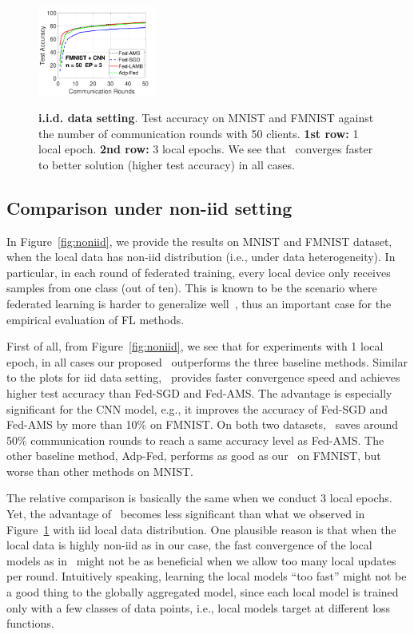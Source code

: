 \documentclass[manuscript,screen,review]{acmart}
\begin{document}
\begin{figure}[h]
\begin{center}
{        \hspace{-0.1in}\includegraphics[width=0.35\textwidth]{new_fmnist_mnist_fig/fmnist_testerror_cnn_ep3_iid1_reddi.pdf}
        }
    \end{center}
	\caption{\textbf{i.i.d. data setting}. Test accuracy on MNIST and FMNIST against the number of communication rounds with 50 clients. \textbf{1st row:} 1 local epoch. \textbf{2nd row:} 3 local epochs. We see that \algo\ converges faster to better solution (higher test accuracy) in all cases.
	}
	\label{fig:iid}\vspace{-0.1in}
\end{figure}


\subsection{Comparison under non-iid setting}



In Figure~\ref{fig:noniid}, we provide the results on  MNIST and FMNIST dataset, when the local data has non-iid distribution (i.e., under data heterogeneity). In particular, in each round of federated training, every local device only receives samples from one class (out of ten). This is known to be the scenario where federated learning is harder to generalize well~\citep{mcmahan2017communication}, thus an important case for the empirical evaluation of FL methods. 

First of all, from Figure~\ref{fig:noniid}, we see that for experiments with 1 local epoch, in all cases our proposed \algo\ outperforms the three baseline methods. Similar to the plots for iid data setting, \algo\ provides faster convergence speed and achieves higher test accuracy than Fed-SGD and Fed-AMS. The advantage is especially significant for the CNN model, e.g., it improves the accuracy of Fed-SGD and Fed-AMS by more than 10\% on FMNIST. On both two datasets, \algo\ saves around 50\% communication rounds to reach a same accuracy level as Fed-AMS. The other baseline method, Adp-Fed, performs as good as our \algo\ on FMNIST, but worse than other methods on MNIST.

The relative comparison is basically the same when we conduct 3 local epochs. Yet, the advantage of \algo\ becomes less significant than what we observed in Figure~\ref{fig:iid} with iid local data distribution. One plausible reason is that when the local data is highly non-iid as in our case, the fast convergence of the local models as in \algo\ might not be as beneficial when we allow too many local updates per round. Intuitively speaking, learning the local models ``too fast'' might not be a good thing to the globally aggregated model, since each local model is trained only with a few classes of data points, i.e., local models target at different loss functions.
\end{document}
